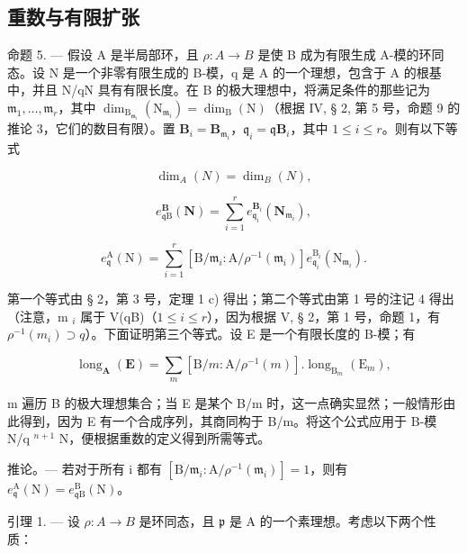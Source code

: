 \subsection{重数与有限扩张}

命题 5. — 假设 A 是半局部环，且 \(\rho: A \to B\) 是使 B 成为有限生成 A-模的环同态。设 N 是一个非零有限生成的 B-模，q 是 A 的一个理想，包含于 A 的根基中，并且 N/qN 具有有限长度。在 B 的极大理想中，将满足条件的那些记为 \(\mathfrak{m}_1, \ldots, \mathfrak{m}_r\)，其中 \(\dim_{\mathrm{B}_{\mathfrak{m}_i}} (\mathrm{N}_{\mathfrak{m}_i}) = \dim_{\mathrm{B}} (\mathrm{N})\)（根据 IV, § 2, 第 5 号，命题 9 的推论 3，它们的数目有限）。置 \(\mathbf{B}_i = \mathbf{B}_{\mathfrak{m}_i}\)，\(\mathfrak{q}_i = \mathfrak{q}\mathbf{B}_i\)，其中 \(1 \leqslant i \leqslant r\)。则有以下等式

\[
\dim_ {A} (N) = \dim_ {B} (N),
\]

\[
e _ {\mathfrak {q} \mathrm{B}} ^ {\mathbf {B}} (\mathbf {N}) = \sum_ {i = 1} ^ {r} e _ {\mathfrak {q} _ {i}} ^ {\mathbf {B} _ {i}} (\mathbf {N} _ {\mathfrak {m} _ {i}}),
\]

\[
e _ {\mathfrak {q}} ^ {\mathrm{A}} (\mathrm{N}) = \sum_ {i = 1} ^ {r} \left[ \mathrm{B} / \mathfrak {m} _ {i}: \mathrm{A} / \rho^ {- 1} (\mathfrak {m} _ {i}) \right] e _ {\mathfrak {q} _ {i}} ^ {\mathrm{B} _ {i}} (\mathrm{N} _ {\mathfrak {m} _ {i}}).
\]

第一个等式由 § 2，第 3 号，定理 1 c) 得出；第二个等式由第 1 号的注记 4 得出（注意，m \(_{i}\) 属于 V(qB)（\(1 \leqslant i \leqslant r\)），因为根据 V, § 2，第 1 号，命题 1，有 \(\rho^{-1}(m_{i}) \supset q\)）。下面证明第三个等式。设 E 是一个有限长度的 B-模；有

\[
\operatorname{long} _ {\mathbf {A}} (\mathbf {E}) = \sum_ {m} \left[ \mathrm{B} / m: \mathrm{A} / \rho^ {- 1} (m) \right]. \operatorname{long} _ {\mathrm{B} _ {m}} \left(\mathrm{E} _ {m}\right),
\]

m 遍历 B 的极大理想集合；当 E 是某个 B/m 时，这一点确实显然；一般情形由此得到，因为 E 有一个合成序列，其商同构于 B/m。将这个公式应用于 B-模 N/q \(^{n+1}\) N，便根据重数的定义得到所需等式。

推论。— 若对于所有 i 都有 \(\left[\mathrm{B}/\mathfrak{m}_{i}:\mathrm{A}/\rho^{-1}(\mathfrak{m}_{i})\right]=1\)，则有 \(e_{\mathfrak{q}}^{\mathrm{A}}(\mathrm{N})=e_{\mathfrak{q}\mathrm{B}}^{\mathrm{B}}(\mathrm{N})\)。

引理 1. — 设 \(\rho: A \to B\) 是环同态，且 \(\mathfrak{p}\) 是 A 的一个素理想。考虑以下两个性质：

